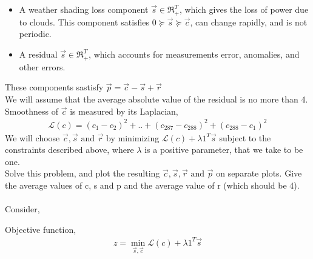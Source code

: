 \documentclass[journal,12pt,twocolumn]{IEEEtran}
\begin{document}
\begin{enumerate}
\begin{itemize}
\item A weather shading loss component $\vec{s} \in \Re_+^T $, which gives the loss of power due to clouds. This component satisfies $0 \succeq \vec{s} \succeq \vec{c}$, can change rapidly, and is not periodic.
\item A residual $\vec{s} \in \Re_+^T $, which accounts for measurements error, anomalies, and other errors.
 \end{itemize}  
 These components sastisfy $ \vec{p}=\vec{c}-\vec{s}+\vec{r}$\\
 We will assume that the average absolute value of the residual is no more than 4.\\
 Smoothness of  $\vec{c}$ is measured by its Laplacian,
 \begin{align}
 \mathcal{L}(c) = (c_1 - c_2)^2 + ..+(c_{287} -c_{288})^2 + (c_{288} - c_{1})^2  \nonumber
 \end{align}
 We will choose $\vec{c} ,\vec{s}  \text{ and }  \vec{r}$ by minimizing $\mathcal{L}(c) + \lambda1^T\vec{s} $ subject to the constraints described above, where $\lambda$ is a positive parameter, that we take to be one.\\
 Solve this problem, and plot the resulting $\vec{c} ,\vec{s}, \vec{r} \text{ and } \vec{p}$ on separate plots. Give the average values of c, s and p and the average value of r (which should be 4).\\
\solution \\
Consider,
\begin{table}[H]
 \centering
 \caption{}
 \end{table}
 Objective function,
  \begin{align}
 z= \min_{\vec{s},\vec{c}} \mathcal{L}(c) + \lambda1^T\vec{s}
 \end{align}

\end{enumerate}
\end{document}
